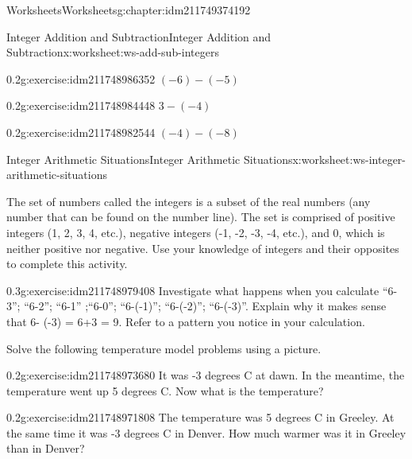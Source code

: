 \documentclass[twoside,11pt,]{book}
\begin{document}
\begin{chapterptx}{Worksheets}{}{Worksheets}{}{}{g:chapter:idm211749374192}
\begin{worksheet-section-numberless}{Integer Addition and Subtraction}{}{Integer Addition and Subtraction}{}{}{x:worksheet:ws-add-sub-integers}
\begin{divisionexercise}{6}{}{0.2}{g:exercise:idm211748986352}
\((-6)-(-5) \)%
\end{divisionexercise}%
\begin{divisionexercise}{7}{}{0.2}{g:exercise:idm211748984448}%
\(3-(-4) \)%
\end{divisionexercise}%
\begin{divisionexercise}{8}{}{0.2}{g:exercise:idm211748982544}%
\((-4)-(-8) \)%
\end{divisionexercise}%
\end{worksheet-section-numberless}
\restoregeometry
%
%
\typeout{************************************************}
\typeout{************************************************}
%
\begin{worksheet-section-numberless}{Integer Arithmetic Situations}{}{Integer Arithmetic Situations}{}{}{x:worksheet:ws-integer-arithmetic-situations}
\begin{introduction}{}%
The set of numbers called the integers is a subset of the real numbers (any number that can be found on the number line).  The set is comprised of positive integers (1, 2, 3, 4, etc.), negative integers (-1, -2, -3, -4, etc.), and 0, which is neither positive nor negative.  Use your knowledge of integers and their opposites to complete this activity.%
\end{introduction}%
\begin{divisionexercise}{1}{}{0.3}{g:exercise:idm211748979408}%
Investigate what happens when you calculate ``6-3'';  ``6-2'';  ``6-1'' ;``6-0''; ``6-(-1)'';     ``6-(-2)''; ``6-(-3)''.  Explain why it makes sense that 6- (-3) = 6+3 = 9.   Refer to a pattern you notice in your calculation.%
\end{divisionexercise}%
\begin{introduction}{}%
Solve the following temperature model problems using a picture.%
\end{introduction}%
\begin{divisionexercise}{2}{}{0.2}{g:exercise:idm211748973680}%
It was -3 degrees C at dawn. In the meantime, the temperature went up 5 degrees C. Now what is the temperature?%
\end{divisionexercise}%
\clearpage
\begin{divisionexercise}{3}{}{0.2}{g:exercise:idm211748971808}%
The temperature was 5 degrees C in Greeley. At the same time it was -3 degrees C in Denver. How much warmer was it in Greeley than in Denver?%
\end{divisionexercise}%

\end{worksheet-section-numberless}
\end{chapterptx}
\end{document}
